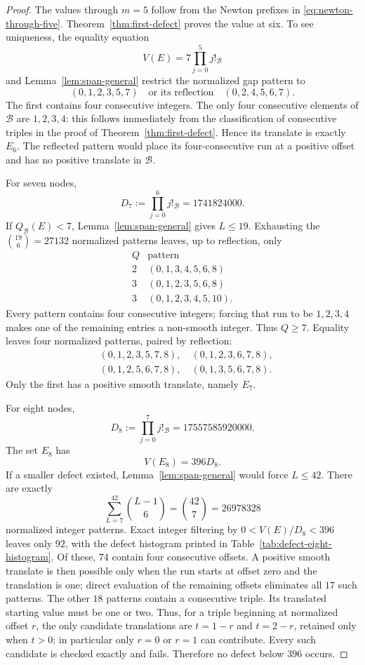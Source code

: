 \documentclass[11pt,oneside]{article}
\theoremstyle{definition}
\theoremstyle{remark}
\newcommand{\B}{\mathcal B}
\begin{document}
\begin{proof}
The values through \(m=5\) follow from the Newton prefixes in
\eqref{eq:newton-through-five}.  Theorem~\ref{thm:first-defect} proves the value at six.  To
see uniqueness, the equality equation
\[
 V(E)=7\prod_{j=0}^{5}j!_{\B}
\]
and Lemma~\ref{lem:span-general} restrict the normalized gap pattern to
\[
 (0,1,2,3,5,7)
 \quad\text{or its reflection}\quad
 (0,2,4,5,6,7).
\]
The first contains four consecutive integers.  The only four consecutive elements of \(\B\)
are \(1,2,3,4\): this follows immediately from the classification of consecutive triples in
the proof of Theorem~\ref{thm:first-defect}.  Hence its translate is exactly \(E_6\).  The
reflected pattern would place its four-consecutive run at a positive offset and has no positive
translate in \(\B\).

For seven nodes,
\[
 D_7:=\prod_{j=0}^{6}j!_{\B}=1741824000.
\]
If \(Q_{\B}(E)<7\), Lemma~\ref{lem:span-general} gives \(L\le19\).  Exhausting the
\(\binom{19}{6}=27132\) normalized patterns leaves, up to reflection, only
\[
\begin{array}{c|c}
 Q&\text{pattern}\ \\ \hline
 2&(0,1,3,4,5,6,8)\\
 3&(0,1,2,3,5,6,8)\\
 3&(0,1,2,3,4,5,10).
\end{array}
\]
Every pattern contains four consecutive integers; forcing that run to be \(1,2,3,4\) makes
one of the remaining entries a non-smooth integer.  Thus \(Q\ge7\).  Equality leaves four
normalized patterns, paired by reflection:
\[
\begin{split}
 &(0,1,2,3,5,7,8),\quad(0,1,2,3,6,7,8),\\
 &(0,1,2,5,6,7,8),\quad(0,1,3,5,6,7,8).
\end{split}
\]
Only the first has a positive smooth translate, namely \(E_7\).

For eight nodes,
\[
 D_8:=\prod_{j=0}^{7}j!_{\B}=17557585920000.
\]
The set \(E_8\) has
\[
 V(E_8)=396D_8.
\]
If a smaller defect existed, Lemma~\ref{lem:span-general} would force \(L\le42\).  There are
exactly
\[
 \sum_{L=7}^{42}\binom{L-1}{6}=\binom{42}{7}=26978328
\]
normalized integer patterns.  Exact integer filtering by
\(0<V(E)/D_8<396\) leaves only \(92\), with the defect histogram printed in
Table~\ref{tab:defect-eight-histogram}.  Of these, \(74\) contain four consecutive offsets.
A positive smooth translate is then possible only when the run starts at offset zero and the
translation is one; direct evaluation of the remaining offsets eliminates all \(17\) such
patterns.  The other \(18\) patterns contain a consecutive triple.  Its translated starting value must
be one or two.  Thus, for a triple beginning at normalized offset \(r\), the only candidate
translations are \(t=1-r\) and \(t=2-r\), retained only when \(t>0\); in particular only
\(r=0\) or \(r=1\) can contribute.  Every such candidate is checked exactly and fails.
Therefore no defect below \(396\) occurs.


\end{proof}
\end{document}
